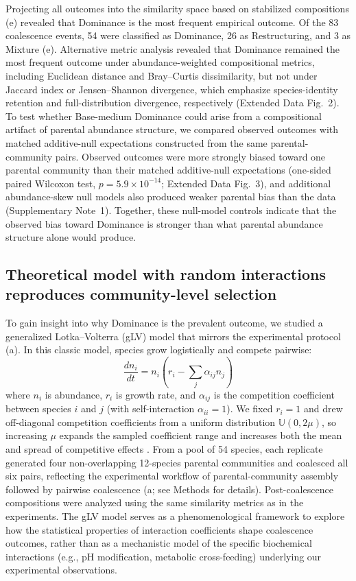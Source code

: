 Projecting all outcomes into the similarity space based on stabilized compositions (e) revealed that Dominance is the most frequent empirical outcome. Of the 83 coalescence events, 54 were classified as Dominance, 26 as Restructuring, and 3 as Mixture (e). Alternative metric analysis revealed that Dominance remained the most frequent outcome under abundance-weighted compositional metrics, including Euclidean distance and Bray--Curtis dissimilarity, but not under Jaccard index or Jensen--Shannon divergence, which emphasize species-identity retention and full-distribution divergence, respectively (Extended Data Fig.~2). To test whether Base-medium Dominance could arise from a compositional artifact of parental abundance structure, we compared observed outcomes with matched additive-null expectations constructed from the same parental-community pairs. Observed outcomes were more strongly biased toward one parental community than their matched additive-null expectations (one-sided paired Wilcoxon test, $p = 5.9 \times 10^{-14}$; Extended Data Fig.~3), and additional abundance-skew null models also produced weaker parental bias than the data (Supplementary Note~1). Together, these null-model controls indicate that the observed bias toward Dominance is stronger than what parental abundance structure alone would produce.


\subsection{Theoretical model with random interactions reproduces community-level selection}
\label{sec:results:glv_model}
To gain insight into why Dominance is the prevalent outcome, we studied a generalized Lotka--Volterra (gLV) model \citep{May1972, Grilli2017} that mirrors the experimental protocol (a). In this classic model, species grow logistically and compete pairwise:
\begin{equation}
\frac{dn_i}{dt} = n_i \left( r_i - \sum_j \alpha_{ij} n_j \right)
\label{eq:glv}
\end{equation}
where $n_i$ is abundance, $r_i$ is growth rate, and $\alpha_{ij}$ is the competition coefficient between species $i$ and $j$ (with self-interaction $\alpha_{ii} = 1$). We fixed $r_i = 1$ and drew off-diagonal competition coefficients from a uniform distribution $\mathbb{U}(0, 2\mu)$, so increasing $\mu$ expands the sampled coefficient range and increases both the mean and spread of competitive effects \citep{Hu2022,Hu2025}. From a pool of 54 species, each replicate generated four non-overlapping 12-species parental communities and coalesced all six pairs, reflecting the experimental workflow of parental-community assembly followed by pairwise coalescence (a; see Methods for details). Post-coalescence compositions were analyzed using the same similarity metrics as in the experiments. The gLV model serves as a phenomenological framework to explore how the statistical properties of interaction coefficients shape coalescence outcomes, rather than as a mechanistic model of the specific biochemical interactions (e.g., pH modification, metabolic cross-feeding) underlying our experimental observations.

